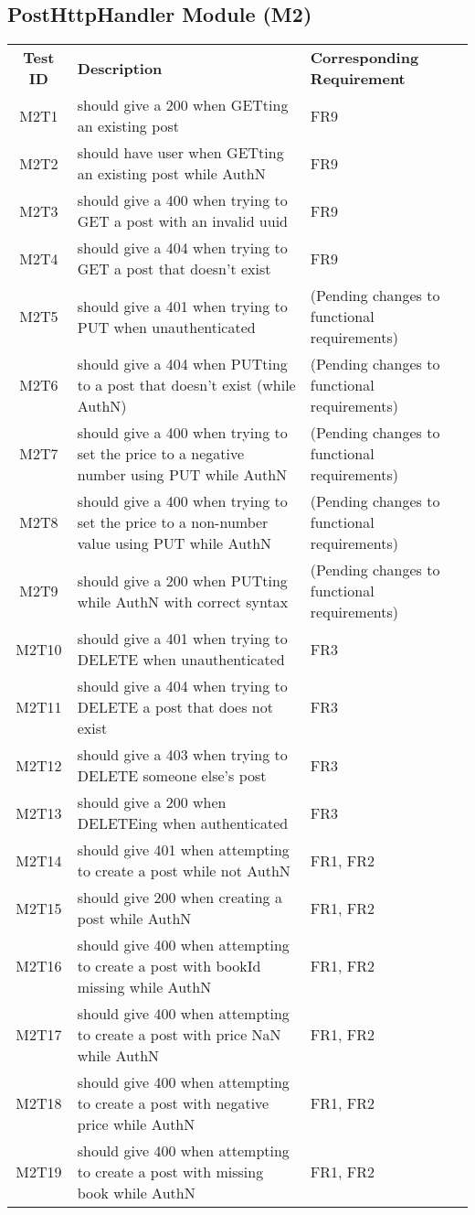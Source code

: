 \documentclass[fullpage]{article}
\begin{document}
\subsection{PostHttpHandler Module (M2)}
\begin{table}[H]
\flushleft
\begin{tabular}{|c|p{8.5cm}|p{5cm}|}
\hline
 \rowcolor{lightgray} 
\textbf{Test ID} &\textbf{Description} &\textbf{Corresponding Requirement}\\
M2T1 & should give a 200 when GETting an existing post & FR9 \\
\hline
M2T2 & should have user when GETting an existing post while AuthN & FR9 \\
\hline
M2T3 & should give a 400 when trying to GET a post with an invalid uuid & FR9 \\
\hline
M2T4 & should give a 404 when trying to GET a post that doesn't exist & FR9 \\
\hline
M2T5 & should give a 401 when trying to PUT when unauthenticated & (Pending changes to functional requirements) \\
\hline
M2T6 & should give a 404 when PUTting to a post that doesn't exist (while AuthN) & (Pending changes to functional requirements) \\
\hline
M2T7 & should give a 400 when trying to set the price to a negative number using PUT while AuthN & (Pending changes to functional requirements) \\
\hline
M2T8 & should give a 400 when trying to set the price to a non-number value using PUT while AuthN & (Pending changes to functional requirements) \\
\hline
M2T9 & should give a 200 when PUTting while AuthN with correct syntax & (Pending changes to functional requirements) \\
\hline
M2T10 & should give a 401 when trying to DELETE when unauthenticated & FR3 \\
\hline
M2T11 & should give a 404 when trying to DELETE a post that does not exist & FR3 \\
\hline
M2T12 & should give a 403 when trying to DELETE someone else's post & FR3 \\
\hline
M2T13 & should give a 200 when DELETEing when authenticated & FR3 \\
\hline
M2T14 & should give 401 when attempting to create a post while not AuthN & FR1, FR2 \\
\hline
M2T15 & should give 200 when creating a post while AuthN & FR1, FR2 \\
\hline
M2T16 & should give 400 when attempting to create a post with bookId missing while AuthN & FR1, FR2 \\
\hline
M2T17 & should give 400 when attempting to create a post with price NaN while AuthN & FR1, FR2 \\
\hline
M2T18 & should give 400 when attempting to create a post with negative price while AuthN & FR1, FR2 \\
\hline
M2T19 & should give 400 when attempting to create a post with missing book while AuthN & FR1, FR2 \\
\hline


\end{tabular}
\end{table}
\end{document}
